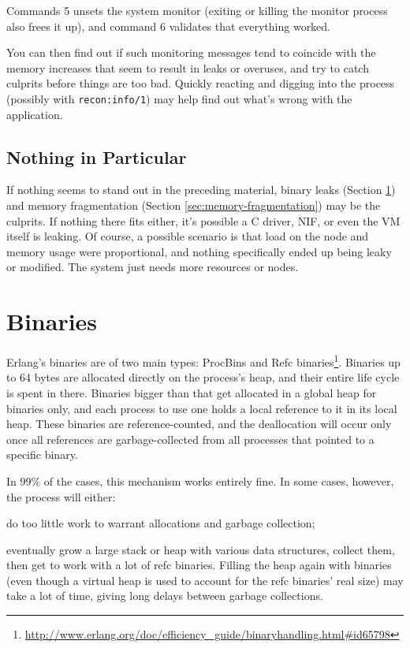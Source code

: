 \documentclass[11pt, oneside]{book}   	%
\newcommand{\function}[1]{\Verb`#1`}
\begin{document}
Commands 5 unsets the system monitor (exiting or killing the monitor process also frees it up), and command 6 validates that everything worked.

You can then find out if such monitoring messages tend to coincide with the memory increases that seem to result in leaks or overuses, and try to catch culprits before things are too bad. Quickly reacting and digging into the process (possibly with \function{recon:info/1}) may help find out what's wrong with the application.

\subsection{Nothing in Particular}

If nothing seems to stand out in the preceding material, binary leaks (Section \ref{sec:binaries}) and memory fragmentation (Section \ref{sec:memory-fragmentation}) may be the culprits. If nothing there fits either, it's possible a C driver, NIF, or even the VM itself is leaking. Of course, a possible scenario is that load on the node and memory usage were proportional, and nothing specifically ended up being leaky or modified. The system just needs more resources or nodes.

\section{Binaries}
\label{sec:binaries}

Erlang's binaries are of two main types: ProcBins and Refc binaries\footnote{\href{http://www.erlang.org/doc/efficiency\_guide/binaryhandling.html\#id65798}{http://www.erlang.org/doc/efficiency\_guide/binaryhandling.html\#id65798}}. Binaries up to 64 bytes are allocated directly on the process's heap, and their entire life cycle is spent in there. Binaries bigger than that get allocated in a global heap for binaries only, and each process to use one holds a local reference to it in its local heap. These binaries are reference-counted, and the deallocation will occur only once all references are garbage-collected from all processes that pointed to a specific binary.

In 99\% of the cases, this mechanism works entirely fine. In some cases, however, the process will either:

\begin{enumerate*}
	\item do too little work to warrant allocations and garbage collection;
         \item eventually grow a large stack or heap with various data structures, collect them, then get to work with a lot of refc binaries. Filling the heap again with binaries (even though a virtual heap is used to account for the refc binaries' real size) may take a lot of time, giving long delays between garbage collections.
\end{enumerate*}
\end{document}
